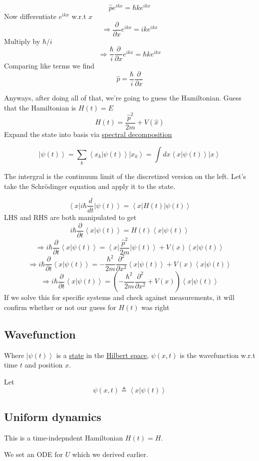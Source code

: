 \documentclass[
]{article}
\let\oldhyperref\hyperref
\renewcommand{\hyperref}[2][]{\oldhyperref[#1]{\underline{#2}}}
\providecommand{\ket}[1]{\left\lvert #1 \right\rangle}
\providecommand{\bra}[1]{\left\langle #1 \right\rvert}
\providecommand{\braket}[1]{\left\langle #1 \right\rangle}
\providecommand{\Rarr}{\Rightarrow}
\begin{document}
\[
	\hat{p}e^{ikx}=\hbar ke^{ikx}
\]
Now differentiate $e^{ikx}$ w.r.t $x$
\[
	\Rarr \frac{\partial}{\partial x}e^{ikx}=ike^{ikx}
\]
Multiply by $\hbar/i$
\[
	\Rarr \frac{\hbar}{i}\frac{\partial}{\partial x}e^{ikx}=\hbar ke^{ikx}
\]
Comparing like terms we find
\[
	\hat{p}=\frac{\hbar}{i}\frac{\partial}{\partial x}
\]


Anyways, after doing all of that, we're going to guess the Hamiltonian.
Guess that the Hamiltonian is $H(t)=E$
\[
	H(t)=\frac{\hat{p}^2}{2m}+V(\hat{x})
\]
Expand the state into basis via \hyperref[spectral-decomposition]{spectral decomposition}

\[
	\ket{\psi(t)}=\sum_k\braket{x_k|\psi(t)}\ket{x_k}=\int dx \braket{x|\psi(t)}\ket{x}
\]

The intergral is the continuum limit of the discretized version on the left.
Let's take the Schrödinger equation and apply it to the state.

\[
	\bra{x}i\hbar \frac{d}{dt}\ket{\psi(t)}=\bra{x}H(t)\ket{\psi(t)}
\]
LHS and RHS are both manipulated to get
\[
	i\hbar \frac{\partial}{\partial t}\braket{x|\psi(t)} =H(t)\braket{x|\psi(t)}
\]
\[
	\Rarr i\hbar \frac{\partial}{\partial t}\braket{x|\psi(t)} =\bra{x}\frac{\hat{p}^2}{2m}\ket{\psi(t)}+V(x)\braket{x|\psi(t)}
\]
\[
	\Rarr i\hbar \frac{\partial}{\partial t}\braket{x|\psi(t)} =-\frac{\hbar^2}{2m}\frac{\partial^2}{\partial x^2}\braket{x|\psi(t)}+V(x)\braket{x|\psi(t)}
\]
\[
	\Rarr i\hbar \frac{\partial}{\partial t}\braket{x|\psi(t)} =\left(-\frac{\hbar^2}{2m}\frac{\partial^2}{\partial x^2}+V(x)\right)\braket{x|\psi(t)}
\]
If we solve this for specific systems and check against measurements, it will confirm whether or not our guess for $H(t)$ was right
\subsection{Wavefunction}\label{wavefunction}
Where $\ket{\psi(t)}$ is a \hyperref[ket-states]{state} in the \hyperref[hilbert-spaces]{Hilbert space}, $\psi(x,t)$ is the wavefunction w.r.t time $t$ and position $x$.

Let
\[
	\psi(x,t)\triangleq\braket{x|\psi(t)}
\]
\subsection{Uniform dynamics}\label{uniform-dynamics}

This is a time-indepndent Hamiltonian $H(t)=H$.

We set an ODE for $U$ which we derived earlier.
\end{document}
